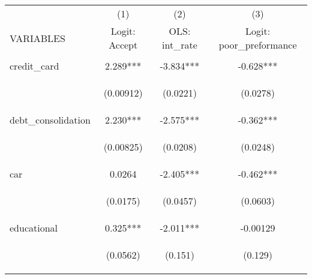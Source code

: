 \begin{center}
\begin{tabular}{lccc} \hline
 & (1) & (2) & (3) \\
VARIABLES & Logit: Accept & OLS: int\_rate & Logit: poor\_preformance \\ \hline
\vspace{4pt} & \begin{footnotesize}\end{footnotesize} & \begin{footnotesize}\end{footnotesize} & \begin{footnotesize}\end{footnotesize} \\
credit\_card & 2.289*** & -3.834*** & -0.628*** \\
\vspace{4pt} & \begin{footnotesize}(0.00912)\end{footnotesize} & \begin{footnotesize}(0.0221)\end{footnotesize} & \begin{footnotesize}(0.0278)\end{footnotesize} \\
debt\_consolidation & 2.230*** & -2.575*** & -0.362*** \\
\vspace{4pt} & \begin{footnotesize}(0.00825)\end{footnotesize} & \begin{footnotesize}(0.0208)\end{footnotesize} & \begin{footnotesize}(0.0248)\end{footnotesize} \\
car & 0.0264 & -2.405*** & -0.462*** \\
\vspace{4pt} & \begin{footnotesize}(0.0175)\end{footnotesize} & \begin{footnotesize}(0.0457)\end{footnotesize} & \begin{footnotesize}(0.0603)\end{footnotesize} \\
educational & 0.325*** & -2.011*** & -0.00129 \\
\vspace{4pt} & \begin{footnotesize}(0.0562)\end{footnotesize} & \begin{footnotesize}(0.151)\end{footnotesize} & \begin{footnotesize}(0.129)\end{footnotesize} \\

\end{tabular}
\end{center}
